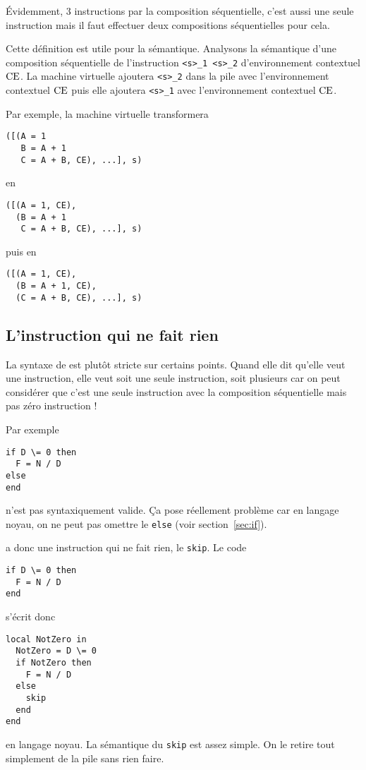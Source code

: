 Évidemment, 3 instructions par la composition séquentielle, c'est
aussi une seule instruction mais il faut effectuer deux compositions
séquentielles pour cela.

Cette définition est utile pour la sémantique.
Analysons la sémantique d'une composition séquentielle de l'instruction
\lstinline|<s>_1 <s>_2| d'environnement contextuel $\mathrm{CE}$.
La machine virtuelle ajoutera \lstinline|<s>_2| dans la pile
avec l'environnement contextuel $\mathrm{CE}$ puis elle ajoutera
\lstinline|<s>_1| avec l'environnement contextuel $\mathrm{CE}$.

Par exemple, la machine virtuelle transformera
\begin{lstlisting}
([(A = 1
   B = A + 1
   C = A + B, CE), ...], s)
\end{lstlisting}
en
\begin{lstlisting}
([(A = 1, CE),
  (B = A + 1
   C = A + B, CE), ...], s)
\end{lstlisting}
puis en
\begin{lstlisting}
([(A = 1, CE),
  (B = A + 1, CE),
  (C = A + B, CE), ...], s)
\end{lstlisting}

\subsection{L'instruction qui ne fait rien}
La syntaxe de \oz{} est plutôt stricte sur certains points.
Quand elle dit qu'elle veut une instruction, elle veut
soit une seule instruction, soit plusieurs car on peut considérer
que c'est une seule instruction avec la composition séquentielle mais
pas zéro instruction !

Par exemple
\begin{lstlisting}
if D \= 0 then
  F = N / D
else
end
\end{lstlisting}
n'est pas syntaxiquement valide.
Ça pose réellement problème car en langage noyau,
on ne peut pas omettre le \lstinline|else| (voir section~\ref{sec:if}).

\oz{} a donc une instruction qui ne fait rien, le \lstinline|skip|. Le code
\begin{lstlisting}
if D \= 0 then
  F = N / D
end
\end{lstlisting}
s'écrit donc
\begin{lstlisting}
local NotZero in
  NotZero = D \= 0
  if NotZero then
    F = N / D
  else
    skip
  end
end
\end{lstlisting}
en langage noyau.
La sémantique du \lstinline|skip| est assez simple.
On le retire tout simplement de la pile sans rien faire.

